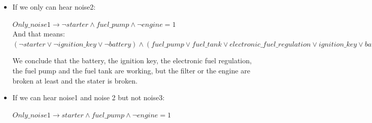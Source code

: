 \documentclass[paper=a4, fontsize=11pt]{scrartcl} %
\numberwithin{equation}{section} %
\numberwithin{figure}{section} %
\numberwithin{table}{section} %
\begin{document}
\begin{itemize}
\begin{itemize}
		$ Only\_noise1 \rightarrow  starter \land \lnot fuel\_pump \land \lnot engine = 1 $\\
		
		And that means: \\
		
	$ (starter \lor ignition\_key \lor battery) \land (\lnot fuel\_pump \lor \lnot fuel\_tank \lor \lnot electronic\_fuel\_regulation \lor \lnot ignition\_key \lor \lnot battery) \land (\lnot engine \lor \lnot filter \lor \lnot fuel\_pump \lor \lnot fuel\_tank \lor \lnot electronic\_fuel\_regulation \lor \lnot ignition\_key \lor \lnot battery \lor \lnot starter \lor \lnot ignition\_key \lor \lnot battery) = 1 $
		
		
		We conclude that the battery, the ignition key and the starter are working, but the electronic fuel regulation or fuel pump are broken at least.
		
		
		
		
\newpage		
		\item If we only can hear noise2:
		
		$ Only\_noise1 \rightarrow  \lnot starter \land fuel\_pump \land \lnot engine = 1 $\\
		
		And that means: \\
		
$ (\lnot starter \lor \lnot ignition\_key \lor \lnot battery) \land ( fuel\_pump \lor fuel\_tank \lor electronic\_fuel\_regulation \lor ignition\_key \lor battery) \land (\lnot engine \lor \lnot filter \lor \lnot fuel\_pump \lor \lnot fuel\_tank \lor \lnot electronic\_fuel\_regulation \lor \lnot ignition\_key \lor \lnot battery \lor \lnot starter \lor \lnot ignition\_key \lor \lnot battery) = 1 $
		
		
		We conclude that the battery, the ignition key, the electronic fuel regulation, the fuel pump and the fuel tank are working, but the filter or the engine are broken at least and the stater is broken.
		
		
\newpage		
		\item If we can hear noise1 and noise 2 but not noise3:
		
		$ Only\_noise1 \rightarrow  starter \land fuel\_pump \land \lnot engine = 1 $\\
		

\end{itemize}
\end{itemize}
\end{document}
